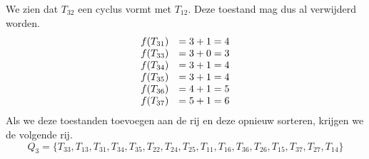 \documentclass[alternative-exam.tex]{subfiles}
\begin{document}
We zien dat $T_{32}$ een cyclus vormt met $T_{12}$. Deze toestand mag dus al verwijderd worden.
\[
\begin{array}{c c}
f(T_{31}) &= 3 + 1 = 4\\
f(T_{33}) &= 3 + 0 = 3\\
f(T_{34}) &= 3 + 1 = 4\\
f(T_{35}) &= 3 + 1 = 4\\
f(T_{36}) &= 4 + 1 = 5\\
f(T_{37}) &= 5 + 1 = 6\\
\end{array}
\]
Als we deze toestanden toevoegen aan de rij en deze opnieuw sorteren, krijgen we de volgende rij.
\[
Q_3 = \{T_{33}, T_{13}, T_{31}, T_{34}, T_{35}, T_{22}, T_{24}, T_{25}, T_{11}, T_{16}, T_{36}, T_{26}, T_{15}, T_{37}, T_{27}, T_{14}\}
\]
\end{document}
